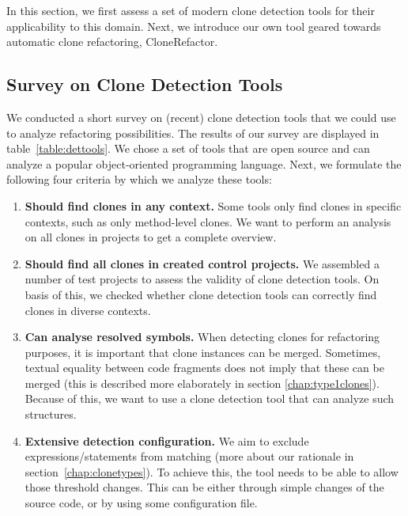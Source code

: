 \documentclass[a4paper]{article}
\begin{document}
In this section, we first assess a set of modern clone detection tools for their applicability to this domain. Next, we introduce our own tool geared towards automatic clone refactoring, CloneRefactor.%

\subsection{Survey on Clone Detection Tools}
\label{ch:tool-overview}
We conducted a short survey on (recent) clone detection tools that we could use to analyze refactoring possibilities. The results of our survey are displayed in table~\ref{table:dettools}. We chose a set of tools that are open source and can analyze a popular object-oriented programming language. Next, we formulate the following four criteria by which we analyze these tools:
\begin{enumerate}
    \item \textbf{Should find clones in any context.} Some tools only find clones in specific contexts, such as only method-level clones. We want to perform an analysis on all clones in projects to get a complete overview.
\item \textbf{Should find all clones in created control projects.} We assembled a number of test projects to assess the validity of clone detection tools. On basis of this, we checked whether clone detection tools can correctly find clones in diverse contexts.
\item \textbf{Can analyse resolved symbols.} When detecting clones for refactoring purposes, it is important that clone instances can be merged. Sometimes, textual equality between code fragments does not imply that these can be merged (this is described more elaborately in section \ref{chap:type1clones}). Because of this, we want to use a clone detection tool that can analyze such structures.
\item \textbf{Extensive detection configuration.} We aim to exclude expressions/statements from matching (more about our rationale in section~\ref{chap:clonetypes}). To achieve this, the tool needs to be able to allow those threshold changes. This can be either through simple changes of the source code, or by using some configuration file.
\end{enumerate}
\end{document}
